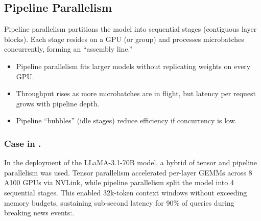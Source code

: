 \subsection{Pipeline Parallelism}
\label{sec:scaling-pipeline-parallelism}
Pipeline parallelism partitions the model into sequential stages (contiguous layer blocks). Each stage resides on a GPU (or group) and processes microbatches concurrently, forming an ``assembly line.''

\begin{tcolorbox}[
  title={\textbf{Pipeline Parallelism: Key Considerations}},
  colback=blue!5,
  colframe=blue!40!black,
  colbacktitle=blue!20,
  coltitle=black,
  fonttitle=\bfseries,
  boxrule=0.7pt,
  arc=4pt,
  left=5mm, right=5mm, top=4mm, bottom=4mm,
  before skip=6pt,
  after skip=6pt
]
\begin{itemize}[leftmargin=1.5em, itemsep=4pt]
  \item Pipeline parallelism fits larger models without replicating weights on every GPU.
  
  \item Throughput rises as more microbatches are in flight, but latency per request grows with pipeline depth.
  
  \item Pipeline ``bubbles'' (idle stages) reduce efficiency if concurrency is low.
\end{itemize}
\end{tcolorbox}


\subsubsection{Case in \ishtar{}.} In the \ishtar{} deployment of the LLaMA-3.1-70B model, a hybrid of tensor and pipeline parallelism was used. Tensor parallelism accelerated per-layer GEMMs across 8 A100 GPUs via NVLink, while pipeline parallelism split the model into 4 sequential stages. This enabled 32k-token context windows without exceeding memory budgets, sustaining sub-second latency for 90\% of queries during breaking news events:\cite{frugalgpt_2023}.

